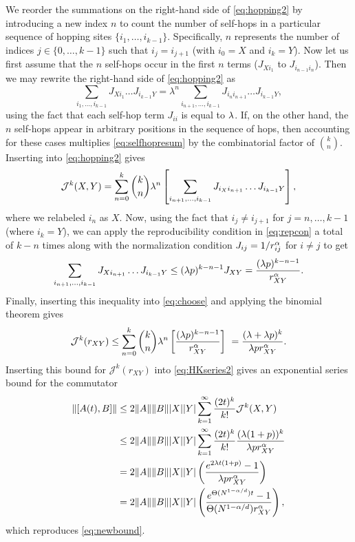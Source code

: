 We reorder the summations on the right-hand side of \cref{eq:hopping2} by introducing a new index $n$ to count the number of self-hops in a particular sequence of hopping sites $\{i_1,\dots,i_{k-1}\}$.
Specifically, $n$ represents the number of indices $j\in\{0,\dots,k-1\}$ such that $i_{j}=i_{j+1}$ (with $i_{0}=X$ and $i_{k}=Y$).
Now let us first assume that the $n$ self-hops occur in the first $n$ terms ($J_{Xi_1}$ to $J_{i_{n-1}i_{n}}$). Then we may rewrite the right-hand side of \cref{eq:hopping2} as
%
\begin{equation}
\label{eq:selfhopresum}
\sum_{i_{1},\dots,i_{k-1}}J_{Xi_{1}}\dots J_{i_{k-1}Y}
= \lambda^n \sum_{i_{n+1},\dots,i_{k-1}}J_{i_{n}i_{n+1}}\dots J_{i_{k-1}Y},
\end{equation}
%
using the fact that each self-hop term $J_{ii}$ is equal to $\lambda$.
If, on the other hand, the $n$ self-hops appear in arbitrary positions in the sequence of hops, then accounting for these cases multiplies \cref{eq:selfhopresum} by the combinatorial factor of $\binom k n$.
Inserting into \cref{eq:hopping2} gives
%
\begin{align}
	\label{eq:choose}
	\mathcal{J}^k(X,Y) = \sum_{n=0}^{k}{\binom k n}\lambda^{n} \left[\sum_{i_{n+1},\dots,i_{k-1}}J_{i_Xi_{n+1}}\dots J_{i_{k-1}Y} \right],
\end{align}
where we relabeled $i_n$ as $X$.
Now, using the fact that $i_{j}\neq i_{j+1}$ for $j=n,\dots,k-1$ (where $i_k=Y$), we can apply the reproducibility condition in \cref{eq:repcon} a total of $k-n$ times along with the normalization condition $J_{ij} = 1/r_{ij}^{\alpha}$ for $i\neq j$ to get
%
\begin{align}
	\sum_{i_{n+1},\dots,i_{k-1}}J_{Xi_{n+1}}\dots J_{i_{k-1}Y} \le (\lambda p)^{k-n-1} J_{XY} = \frac{(\lambda p)^{k-n-1}}{r_{XY}^{\alpha}}.
\end{align}
%
Finally, inserting this inequality into \cref{eq:choose} and applying the binomial theorem gives
\begin{equation}
\mathcal{J}^{k}(r_{XY}) \le \sum_{n=0}^{k}{\binom k n}\lambda^{n}\left[\frac{(\lambda p)^{k-n-1}}{r_{XY}^{\alpha}}\right]\ = \frac{(\lambda+\lambda p)^{k}}{\lambda pr_{XY}^{\alpha}}.
\end{equation}
Inserting this bound for $\mathcal{J}^{k}(r_{XY})$ into \cref{eq:HKseries2} gives an exponential series bound for the commutator
\begin{align}
	\|[A(t),B]\| &\le 2\|A\|\|B\||X||Y|\sum_{k=1}^{\infty}\frac{(2t)^{k}}{k!} \mathcal{J}^k(X,Y) \\
    &\le 2\|A\|\|B\||X||Y|\sum_{k=1}^{\infty}\frac{(2t)^{k}}{k!} \frac{(\lambda(1+p))^{k}}{\lambda pr_{XY}^{\alpha}}\\
    &= 2\|A\|\|B\||X||Y| \left(\frac{e^{2\lambda t(1+p)}-1}{\lambda pr_{XY}^{\alpha}}\right) \\
    &= 2\|A\|\|B\||X||Y|\left(\frac{e^{\Theta(N^{1-\alpha/d})t}-1}{\Theta(N^{1-\alpha/d})r_{XY}^{\alpha}}\right), \label{eq:newbound2}
\end{align}
which reproduces \cref{eq:newbound}.


